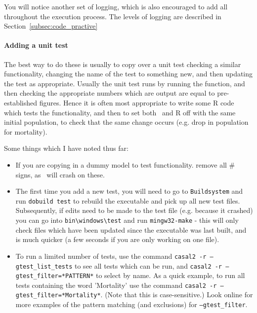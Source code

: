 You will notice another set of logging, which is also encouraged to add all throughout the execution process. The levels of logging are described in Section~\ref{subsec:code_practive}

\paragraph*{Adding a unit test}

The best way to do these is usually to copy over a unit test checking a similar functionality, changing the name of the test to something new, and then updating the test as appropriate. Usually the unit test runs by running the function, and then checking the appropriate numbers which are output are equal to pre-established figures. Hence it is often most appropriate to write some R code which tests the functionality, and then to set both \CNAME\ and R off with the same initial population, to check that the same change occurs (e.g. drop in population for mortality).

Some things which I have noted thus far:
\begin{itemize}
	\item If you are copying in a dummy model to test functionality. remove all \# signs, as \CNAME\ will crash on these.
	\item The first time you add a new test, you will need to go to \texttt{Buildsystem} and run \texttt{dobuild test} to rebuild the executable and pick up all new test files. Subsequently, if edits need to be made to the test file (e.g. because it crashed) you can go into \texttt{bin\textbackslash windows\textbackslash test} and run \texttt{mingw32-make} - this will only check files which have been updated since the executable was last built, and is much quicker (a few seconds if you are only working on one file).
	\item To run a limited number of tests, use the command \texttt{casal2 -r --gtest\_list\_tests} to see all tests which can be run, and \texttt{casal2 -r --gtest\_filter=*PATTERN*} to select by name. As a quick example, to run all tests containing the word 'Mortality' use the command \texttt{casal2 -r --gtest\_filter=*Mortality*}. (Note that this is case-sensitive.) Look online for more examples of the pattern matching (and exclusions) for \texttt{--gtest\_filter}.
\end{itemize}
